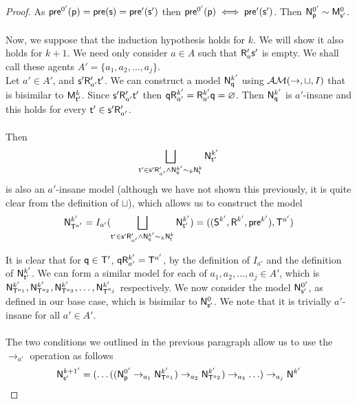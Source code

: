 \begin{proof}
	As $\evpr^{0'}(\evp) = \evpr(\evs) = \evpr'(\evs')$ then $\evpr^{0'}(\evp) \iff
  \evpr'(\evs')$.
	Then $\evM^{0'}_{\evp} \sim \evMM^0_{\evs'}$.\\
	\\
	Now, we suppose that the induction hypothesis holds for $k$.
	We will show it also holds for $k+1$.
	We need only consider $a \in A$ such that $\evR'_a \evs'$ is empty.
	We shall call these agents $A' = \{a_1,a_2,\ldots,a_j\}$.
  \\
  Let $a' \in A'$, and $\evs' \evR'_{a'} \evt'$.
  We can construct a model $\evM^{k'}_{\evq}$ using $\EM(\to,\sqcup,I)$ that is
  bisimilar to $\evMM^k_{\evt'}$.
  Since $\evs' \evR'_{a'} \evt'$ then $\evq \evR^{k'}_{a'} = \evR^{k'}_{a'}
  \evq = \varnothing$.
  Then $\evM^{k'}_{\evq}$ is $a'$-insane and this holds for every $\evt' \in
  \evs' \evR'_{a'}$.\\
  \\
  Then
  \[
    \bigsqcup_{\evt' \in \evs' \evR'_{a'} \land \evM^{k'}_{\evq} \sim_k
      \evM^k_\evt} \evM^{k'}_{\evt'}
  \]
  is also an $a'$-insane model (although we have not shown this previously, it
  is quite clear from the definition of $\sqcup$), which allows us to construct the model
  \[
    \evM^{k'}_{\evT^{a'}} = I_{a'}(\bigsqcup_{\evt' \in \evs' \evR'_{a'} \land \evM^{k'}_{\evq} \sim_k
      \evM^k_\evt} \evM^{k'}_{\evt'}) = ((\evS^{k'},\evR^{k'},\evpr^{k'}),\evT^{a'})
  \]

  It is clear that for $\evq \in \evT'$, $\evq \evR^{k'}_{a'} = \evT^{a'}$, by the
  definition of $I_{a'}$ and the definition of $\evM^{k'}_{\evt'}$.
  We can form a similar model for each of $a_1,a_2,\ldots,a_j \in A'$, which is
  $\evM^{k'}_{\evT^{a_1}}, \evM^{k'}_{\evT^{a_2}}, \evM^{k'}_{\evT^{a_3}},
  \ldots, \evM^{k'}_{\evT^{a_j}}$ respectively.
  We now consider the model $\evM^{0'}_{\evs'}$, as defined in our base case,
  which is bisimilar to $\evM^0_{\evs'}$.
  We note that it is trivially $a'$-insane for all $a' \in A'$.\\
  \\
  The two conditions we outlined in the previous paragraph allow us to use the $\to_{a'}$ operation as follows
  \[
		\evM^{k+1'}_{\evs'} = (\ldots((\evM^{0'}_{\evp} \to_{a_1}
            \evM^{k'}_{\evT^{a_1}}) \to_{a_2} \evM^{k'}_{\evT^{a_2}}) \to_{a_3}
        \ldots ) \to_{a_j} \evM^{k'}
  \]


\end{proof}
